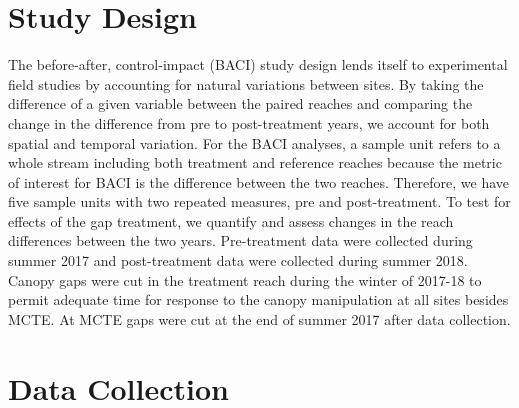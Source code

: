 \documentclass[double,12pt]{beavtex}
\begin{document}
  \begin{table}[t]
  
  \caption{\label{tab:table1}Study site attributes}
  \centering
  \end{table}
  
  \section*{Study Design}\label{study-design}
  
  The before-after, control-impact (BACI) study design lends itself to
  experimental field studies by accounting for natural variations between
  sites. By taking the difference of a given variable between the paired
  reaches and comparing the change in the difference from pre to
  post-treatment years, we account for both spatial and temporal
  variation. For the BACI analyses, a sample unit refers to a whole stream
  including both treatment and reference reaches because the metric of
  interest for BACI is the difference between the two reaches. Therefore,
  we have five sample units with two repeated measures, pre and
  post-treatment. To test for effects of the gap treatment, we quantify
  and assess changes in the reach differences between the two years.
  Pre-treatment data were collected during summer 2017 and post-treatment
  data were collected during summer 2018. Canopy gaps were cut in the
  treatment reach during the winter of 2017-18 to permit adequate time for
  response to the canopy manipulation at all sites besides MCTE. At MCTE
  gaps were cut at the end of summer 2017 after data collection.
  
  \section*{Data Collection}\label{data-collection}
  
\end{document}
